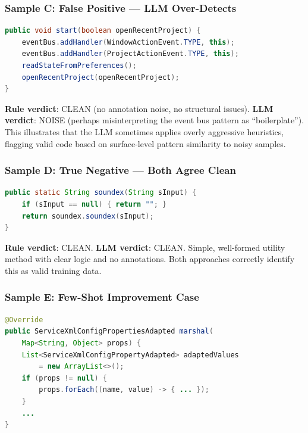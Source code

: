 \documentclass[acmlarge,nonacm,screen]{acmart}
\begin{document}
\subsubsection{Sample C: False Positive --- LLM Over-Detects}

\begin{lstlisting}[language=Java,caption={Real sample: LLM incorrectly flags as NOISE, rules say CLEAN}]
public void start(boolean openRecentProject) {
    eventBus.addHandler(WindowActionEvent.TYPE, this);
    eventBus.addHandler(ProjectActionEvent.TYPE, this);
    readStateFromPreferences();
    openRecentProject(openRecentProject);
}
\end{lstlisting}

\textbf{Rule verdict}: CLEAN (no annotation noise, no structural issues). \textbf{LLM verdict}: NOISE (perhaps misinterpreting the event bus pattern as ``boilerplate''). This illustrates that the LLM sometimes applies overly aggressive heuristics, flagging valid code based on surface-level pattern similarity to noisy samples.

\subsubsection{Sample D: True Negative --- Both Agree Clean}

\begin{lstlisting}[language=Java,caption={Real sample: Both correctly identify as clean}]
public static String soundex(String sInput) {
    if (sInput == null) { return ""; }
    return soundex.soundex(sInput);
}
\end{lstlisting}

\textbf{Rule verdict}: CLEAN. \textbf{LLM verdict}: CLEAN. Simple, well-formed utility method with clear logic and no annotations. Both approaches correctly identify this as valid training data.

\subsubsection{Sample E: Few-Shot Improvement Case}

\begin{lstlisting}[language=Java,caption={Real sample: Zero-shot misses, few-shot catches}]
@Override
public ServiceXmlConfigPropertiesAdapted marshal(
    Map<String, Object> props) {
    List<ServiceXmlConfigPropertyAdapted> adaptedValues
        = new ArrayList<>();
    if (props != null) {
        props.forEach((name, value) -> { ... });
    }
    ...
}
\end{lstlisting}
\end{document}

